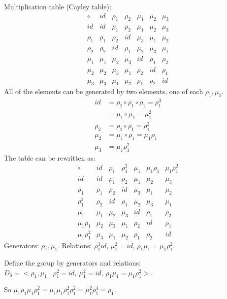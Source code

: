 \documentclass[]{article}
\begin{document}
\begin{example}
		Multiplication table (Cayley table):
$$\begin{array}{c|cccccc}
	\circ & id & \rho_1 & \rho_2 & \mu_1 & \mu_2 & \mu_3 \\ 
	\hline
	id & id & \rho_1 & \rho_2 & \mu_1 & \mu_2 & \mu_3 \\ 
	\rho_1 & \rho_1 & \rho_2 & id & \mu_3 & \mu_1 & \mu_2 \\ 
	\rho_2 & \rho_2 & id & \rho_1 & \mu_2 & \mu_3 & \mu_1 \\ 
	\mu_1 & \mu_1 & \mu_2 & \mu_3 & id & \rho_1 & \rho_2 \\ 
	\mu_2 & \mu_2 & \mu_3 & \mu_1 & \rho_2 & id & \rho_1 \\ 
	\mu_3 & \mu_3 & \mu_1 & \mu_2 & \rho_1 & \rho_2 & id
\end{array}$$
		All of the elements can be generated by two elements, one of each $\rho_1,\mu_1$.
		\begin{align*}
				id &= \rho_1\circ \rho_1 \circ \rho_1 = \rho_1^3 \\
				   &= \mu_1\circ\mu_1 = \mu_1^2 \\
				\rho_2 &= \rho_1\circ\rho_1 = \rho_1^2 \\
				\mu_2 &= \mu_1\circ\rho_1 = \mu_1\rho_1 \\
				\mu_3 &= \mu_1\rho_1^2
		\end{align*}
		The table can be rewritten as:
		$$\begin{array}{c|cccccc}
     \circ & id & \rho_1 & \rho_1^2 & \mu_1 & \mu_1\rho_1 & \mu_1\rho_1^2 \\
     \hline
     id & id & \rho_1 & \rho_2 & \mu_1 & \mu_2 & \mu_3 \\
     \rho_1 & \rho_1 & \rho_2 & id & \mu_3 & \mu_1 & \mu_2 \\
	 \rho_1^2 & \rho_2 & id & \rho_1 & \mu_2 & \mu_3 & \mu_1 \\
     \mu_1 & \mu_1 & \mu_2 & \mu_3 & id & \rho_1 & \rho_2 \\
     \mu_1\rho_1 & \mu_2 & \mu_3 & \mu_1 & \rho_2 & id & \rho_1 \\
     \mu_1\rho_1^2 & \mu_3 & \mu_1 & \mu_2 & \rho_1 & \rho_2 & id
 \end{array}$$
		Generators: $\rho_1,\mu_1$.
		Relations: $\rho_1^3 id$, $\mu_1^2 = id$, $\rho_1\mu_1 = \mu_1\rho_1^2$.

		Define the gorup by generators and relations: $D_6 = <\rho_1,\mu_1 \mid \rho_1^2 = id,\ \mu_1^2 = id,\ \rho_1\mu_1 = \mu_1\rho_1^2 >$.

		So $\mu_1\rho_1\mu_1\rho_1^2 = \mu_1\mu_1\rho_1^2\rho_1^2 = \mu_1^2\rho_1^4 = \rho_1$.
\end{example}
\end{document}
